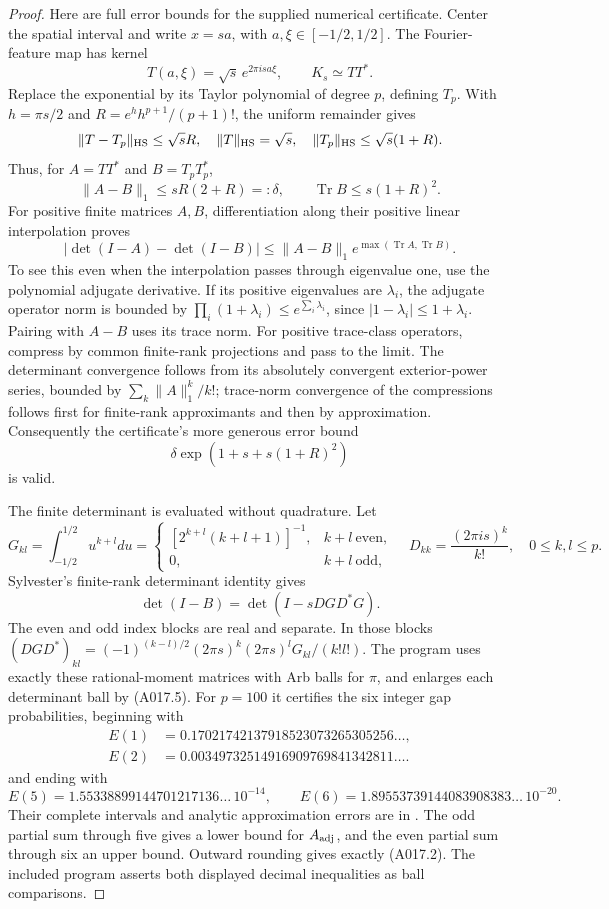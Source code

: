 \begin{proof}
Here are full error bounds for the supplied numerical certificate.
Center the spatial interval and write $x=sa$, with
$a,\xi\in[-1/2,1/2]$. The Fourier-feature map has kernel
\[
 T(a,\xi)=\sqrt s\,e^{2\pi is a\xi},\qquad K_s\simeq TT^*.
\]
Replace the exponential by its Taylor polynomial of degree $p$,
defining $T_p$. With $h=\pi s/2$ and
$R=e^h h^{p+1}/(p+1)!$, the uniform remainder gives
\[
 \|T-T_p\|_{\rm HS}\le\sqrt s R,\quad
 \|T\|_{\rm HS}=\sqrt s,\quad
 \|T_p\|_{\rm HS}\le\sqrt s(1+R).
\]
Thus, for $A=TT^*$ and $B=T_pT_p^*$,
\[
 \|A-B\|_1\le sR(2+R)=:\delta,
 \qquad \operatorname{Tr}B\le s(1+R)^2.               \tag{A017.4}
\]
For positive finite matrices $A,B$, differentiation along their
positive linear interpolation proves
\[
 |\det(I-A)-\det(I-B)|
 \le\|A-B\|_1e^{\max(\operatorname{Tr}A,
                                    \operatorname{Tr}B)}.
\]
To see this even when the interpolation passes through eigenvalue
one, use the polynomial adjugate derivative. If its positive
eigenvalues are $\lambda_i$, the adjugate operator norm is bounded
by $\prod_i(1+\lambda_i)\le e^{\sum_i\lambda_i}$, since
$|1-\lambda_i|\le1+\lambda_i$. Pairing with $A-B$ uses its
trace norm. For positive trace-class operators, compress by common
finite-rank projections and pass to the limit. The determinant
convergence follows from its absolutely convergent exterior-power
series, bounded by $\sum_k\|A\|_1^k/k!$; trace-norm convergence
of the compressions follows first for finite-rank approximants and
then by approximation. Consequently the certificate's more generous
error bound
\[
 \delta\exp(1+s+s(1+R)^2)                             \tag{A017.5}
\]
is valid.

The finite determinant is evaluated without quadrature. Let
\[
 G_{kl}=\int_{-1/2}^{1/2}u^{k+l}du
 =\begin{cases}
  [2^{k+l}(k+l+1)]^{-1},&k+l\ \text{even},\\
 0,&k+l\ \text{odd},
 \end{cases}
 \quad D_{kk}=\frac{(2\pi is)^k}{k!},\quad0\le k,l\le p.
\]
Sylvester's finite-rank determinant identity gives
\[
 \det(I-B)=\det(I-sDGD^*G).
\]
The even and odd index blocks are real and separate. In those
blocks $(DGD^*)_{kl}=(-1)^{(k-l)/2}
 (2\pi s)^k(2\pi s)^lG_{kl}/(k!l!)$.
The program uses exactly these rational-moment matrices with Arb
balls for $\pi$, and enlarges each determinant ball by (A017.5).
For $p=100$ it certifies the six integer gap probabilities, beginning
with
\begin{align*}
 E(1)&=0.17021742137918523073265305256\ldots,\\
 E(2)&=0.00349732514916909769841342811\ldots.
\end{align*}
and ending with
\[
 E(5)=1.55338899144701217136\ldots\,10^{-14},\qquad
 E(6)=1.89553739144083908383\ldots\,10^{-20}.
\]
Their complete intervals and analytic approximation errors are in
. The odd partial sum
through five gives a lower bound for $A_{\rm adj}$, and the even
partial sum through six an upper bound. Outward rounding gives
exactly (A017.2). The included program asserts both displayed
decimal inequalities as ball comparisons.
\end{proof}

